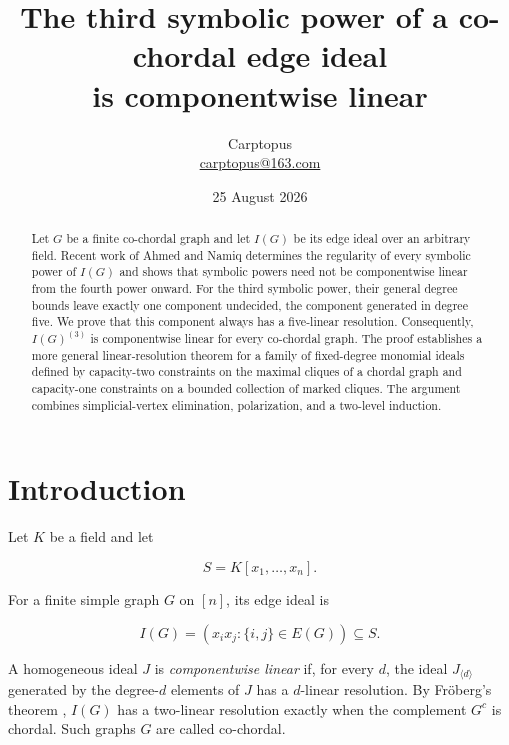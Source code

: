 \documentclass[11pt]{article}
\title{The third symbolic power of a co-chordal edge ideal\\
is componentwise linear}
\author{Carptopus\\\href{mailto:carptopus@163.com}{carptopus@163.com}}
\date{25 August 2026}
\theoremstyle{definition}
\theoremstyle{remark}
\numberwithin{equation}{section}
\begin{document}
\maketitle

\begin{center}
\end{center}

\begin{abstract}


Let $G$ be a finite co-chordal graph and let $I(G)$ be its edge ideal over an
arbitrary field. Recent work of Ahmed and Namiq determines the regularity of
every symbolic power of $I(G)$ and shows that symbolic powers need not be
componentwise linear from the fourth power onward. For the third symbolic
power, their general degree bounds leave exactly one component undecided, the
component generated in degree five. We prove that this component always has a
five-linear resolution. Consequently, $I(G)^{(3)}$ is componentwise linear for
every co-chordal graph. The proof establishes a more general linear-resolution
theorem for a family of fixed-degree monomial ideals defined by capacity-two
constraints on the maximal cliques of a chordal graph and capacity-one
constraints on a bounded collection of marked cliques. The argument combines
simplicial-vertex elimination, polarization, and a two-level induction.

\end{abstract}

\section{Introduction}


Let $K$ be a field and let

\nopagebreak[4]
\[
S=K[x_1,\ldots,x_n].
\]

For a finite simple graph $G$ on $[n]$, its edge ideal is

\nopagebreak[4]
\[
I(G)=(x_i x_j:\{i,j\}\in E(G))\subseteq S.
\]

A homogeneous ideal $J$ is \emph{componentwise linear} if, for every $d$, the ideal
$J_{\langle d\rangle}$ generated by the degree-$d$ elements of $J$ has a
$d$-linear resolution. By Fröberg's theorem \cite{froberg1990}, $I(G)$ has a two-linear
resolution exactly when the complement $G^c$ is chordal. Such graphs $G$ are
called co-chordal.
\end{document}
